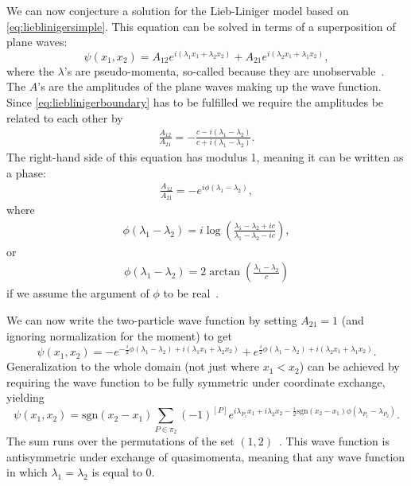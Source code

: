 \documentclass[11pt, a4paper]{report} %
\begin{document}
We can now conjecture a solution for the Lieb-Liniger model based on \cref{eq:lieblinigersimple}.
This equation can be solved in terms of a superposition of plane waves:
\begin{equation}
	\psi(x_1,x_2) = A_{12} e^{i(\lambda_1x_1 + \lambda_2 x_2)} + A_{21} e^{i(\lambda_2 x_1 + \lambda_1 x_2)},
\end{equation}
where the \(\lambda\)'s are pseudo-momenta, so-called because they are unobservable~\cite{Franchini2017}.
The \(A\)'s are the amplitudes of the plane waves making up the wave function.
Since \cref{eq:lieblinigerboundary} has to be fulfilled we require the amplitudes be related to each other by
\begin{align}
	\frac{A_{12}}{A_{21}} = -\frac{c-i(\lambda_1 - \lambda_2) }{c+i(\lambda_1 - \lambda_2)}.
\end{align}
The right-hand side of this equation has modulus 1, meaning it can be written as a phase:
\begin{align}
	\frac{A_{12}}{A_{21}} = -e^{i\phi(\lambda_1-\lambda_2)},
\end{align}
where~\cite{Korepin1993}
\begin{align}
  \phi(\lambda_1-\lambda_2) = i \log(\frac{\lambda_1-\lambda_2 + ic}{\lambda_1-\lambda_2-ic}),
\end{align}
or
\begin{align}
	\phi(\lambda_1-\lambda_2) = 2\arctan\left(\frac{\lambda_1-\lambda_2}{c}\right)
\end{align}
if we assume the argument of \(\phi\) to be real~\cite{Panfil2014}.

We can now write the two-particle wave function by setting \(A_{21}=1\) (and ignoring normalization for the moment) to get
\begin{equation}
	\psi(x_1,x_2) = - e^{-\frac{i}{2}\phi(\lambda_1-\lambda_2)+i(\lambda_1x_1 + \lambda_2 x_2)} + e^{\frac{i}{2}\phi(\lambda_1-\lambda_2)+i(\lambda_2 x_1 + \lambda_1 x_2)}.
\end{equation}
Generalization to the whole domain (not just where \(x_1 < x_2\)) can be achieved by requiring the wave function to be fully symmetric under coordinate exchange,
yielding
\begin{equation}
  \psi(x_1,x_2) = \textrm{sgn}(x_2-x_1)\sum_{P\in\pi_2} (-1)^{[P]} e^{i\lambda_{P_1}x_1 + i \lambda_2 x_2- \frac{i}{2} \textrm{sgn}(x_2-x_1)\phi(\lambda_{P_1}-\lambda_{P_2})}.
\end{equation}
The sum runs over the permutations of the set \((1,2)\)~\cite{Caux2015}.
This wave function is antisymmetric under exchange of quasimomenta, meaning that any wave function in which \(\lambda_1=\lambda_2\) is equal to 0.
\end{document}

